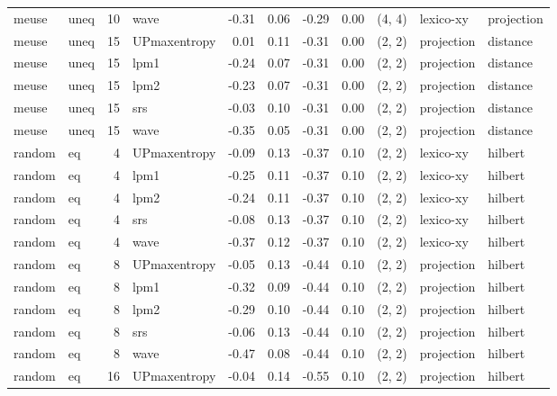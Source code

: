 \begin{tabular}{llrlrrrrlll}
 meuse &  uneq & 10 &         wave & -0.31 &     0.06 &  -0.29 &       0.00 & (4, 4) &   lexico-xy & projection \\
 meuse &  uneq & 15 & UPmaxentropy &  0.01 &     0.11 &  -0.31 &       0.00 & (2, 2) &  projection & distance \\
 meuse &  uneq & 15 &         lpm1 & -0.24 &     0.07 &  -0.31 &       0.00 & (2, 2) &  projection & distance \\
 meuse &  uneq & 15 &         lpm2 & -0.23 &     0.07 &  -0.31 &       0.00 & (2, 2) &  projection & distance \\
 meuse &  uneq & 15 &          srs & -0.03 &     0.10 &  -0.31 &       0.00 & (2, 2) &  projection & distance \\
 meuse &  uneq & 15 &         wave & -0.35 &     0.05 &  -0.31 &       0.00 & (2, 2) &  projection & distance \\
random &    eq &  4 & UPmaxentropy & -0.09 &     0.13 &  -0.37 &       0.10 & (2, 2) &   lexico-xy &    hilbert \\
random &    eq &  4 &         lpm1 & -0.25 &     0.11 &  -0.37 &       0.10 & (2, 2) &   lexico-xy &    hilbert \\
random &    eq &  4 &         lpm2 & -0.24 &     0.11 &  -0.37 &       0.10 & (2, 2) &   lexico-xy &    hilbert \\
random &    eq &  4 &          srs & -0.08 &     0.13 &  -0.37 &       0.10 & (2, 2) &   lexico-xy &    hilbert \\
random &    eq &  4 &         wave & -0.37 &     0.12 &  -0.37 &       0.10 & (2, 2) &   lexico-xy &    hilbert \\
random &    eq &  8 & UPmaxentropy & -0.05 &     0.13 &  -0.44 &       0.10 & (2, 2) &  projection &    hilbert \\
random &    eq &  8 &         lpm1 & -0.32 &     0.09 &  -0.44 &       0.10 & (2, 2) &  projection &    hilbert \\
random &    eq &  8 &         lpm2 & -0.29 &     0.10 &  -0.44 &       0.10 & (2, 2) &  projection &    hilbert \\
random &    eq &  8 &          srs & -0.06 &     0.13 &  -0.44 &       0.10 & (2, 2) &  projection &    hilbert \\
random &    eq &  8 &         wave & -0.47 &     0.08 &  -0.44 &       0.10 & (2, 2) &  projection &    hilbert \\
random &    eq & 16 & UPmaxentropy & -0.04 &     0.14 &  -0.55 &       0.10 & (2, 2) &  projection &    hilbert \\

\end{tabular}
